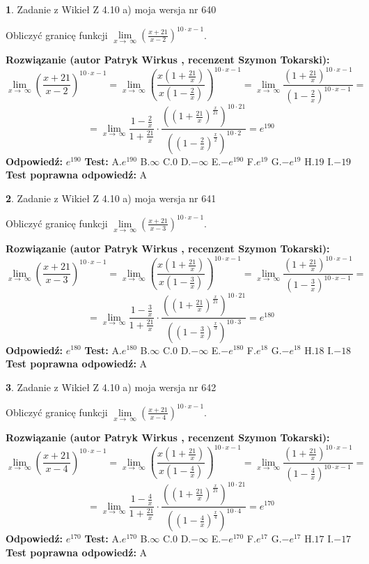 \documentclass[12pt, a4paper]{article}
\theoremstyle{definition} %
\newtheorem{zad}{}
\newcommand{\zadStart}[1]{\begin{zad}#1\newline}
\newcommand{\zadStop}{\end{zad}}
\newcommand{\rozwStart}[2]{\noindent \textbf{Rozwiązanie (autor #1 , recenzent #2): }\newline}
\newcommand{\rozwStop}{\newline}
\newcommand{\odpStart}{\noindent \textbf{Odpowiedź:}\newline}
\newcommand{\odpStop}{\newline}
\newcommand{\testStart}{\noindent \textbf{Test:}\newline}
\newcommand{\testStop}{\newline}
\newcommand{\kluczStart}{\noindent \textbf{Test poprawna odpowiedź:}\newline}
\newcommand{\kluczStop}{\newline}
\begin{document}
\zadStart{Zadanie z Wikieł Z 4.10 a) moja wersja nr 640}

Obliczyć granicę funkcji  $\lim\limits_{x\to\ \infty}(\frac{x+21}{x-2})^{10\cdot x-1}$.
\zadStop
\rozwStart{Patryk Wirkus}{Szymon Tokarski}
$$\lim\limits_{x\to\ \infty}(\frac{x+21}{x-2})^{10\cdot x-1} = \lim\limits_{x\to\ \infty}(\frac{x(1+\frac{21}{x})}{x(1-\frac{2}{x})})^{10\cdot x-1}=\lim\limits_{x\to\ \infty}\frac{(1+\frac{21}{x})^{10\cdot x-1}}{(1-\frac{2}{x})^{10\cdot x-1}}=$$
$$=\lim\limits_{x\to\ \infty}\frac{1-\frac{2}{x}}{1+\frac{21}{x}}\cdot\frac{((1+\frac{21}{x})^{\frac{x}{21}})^{10\cdot21}}{((1-\frac{2}{x})^{\frac{x}{2}})^{10\cdot2}}=e^{190}$$
\rozwStop
\odpStart
$e^{190}$
\odpStop
\testStart
A.$e^{190}$ B.$\infty$ C.$0$ D.$-\infty$ E.$-e^{190}$
F.$e^{19}$ G.$-e^{19}$
H.$19$
I.$-19$
\testStop
\kluczStart
A
\kluczStop



\zadStart{Zadanie z Wikieł Z 4.10 a) moja wersja nr 641}

Obliczyć granicę funkcji  $\lim\limits_{x\to\ \infty}(\frac{x+21}{x-3})^{10\cdot x-1}$.
\zadStop
\rozwStart{Patryk Wirkus}{Szymon Tokarski}
$$\lim\limits_{x\to\ \infty}(\frac{x+21}{x-3})^{10\cdot x-1} = \lim\limits_{x\to\ \infty}(\frac{x(1+\frac{21}{x})}{x(1-\frac{3}{x})})^{10\cdot x-1}=\lim\limits_{x\to\ \infty}\frac{(1+\frac{21}{x})^{10\cdot x-1}}{(1-\frac{3}{x})^{10\cdot x-1}}=$$
$$=\lim\limits_{x\to\ \infty}\frac{1-\frac{3}{x}}{1+\frac{21}{x}}\cdot\frac{((1+\frac{21}{x})^{\frac{x}{21}})^{10\cdot21}}{((1-\frac{3}{x})^{\frac{x}{3}})^{10\cdot3}}=e^{180}$$
\rozwStop
\odpStart
$e^{180}$
\odpStop
\testStart
A.$e^{180}$ B.$\infty$ C.$0$ D.$-\infty$ E.$-e^{180}$
F.$e^{18}$ G.$-e^{18}$
H.$18$
I.$-18$
\testStop
\kluczStart
A
\kluczStop



\zadStart{Zadanie z Wikieł Z 4.10 a) moja wersja nr 642}

Obliczyć granicę funkcji  $\lim\limits_{x\to\ \infty}(\frac{x+21}{x-4})^{10\cdot x-1}$.
\zadStop
\rozwStart{Patryk Wirkus}{Szymon Tokarski}
$$\lim\limits_{x\to\ \infty}(\frac{x+21}{x-4})^{10\cdot x-1} = \lim\limits_{x\to\ \infty}(\frac{x(1+\frac{21}{x})}{x(1-\frac{4}{x})})^{10\cdot x-1}=\lim\limits_{x\to\ \infty}\frac{(1+\frac{21}{x})^{10\cdot x-1}}{(1-\frac{4}{x})^{10\cdot x-1}}=$$
$$=\lim\limits_{x\to\ \infty}\frac{1-\frac{4}{x}}{1+\frac{21}{x}}\cdot\frac{((1+\frac{21}{x})^{\frac{x}{21}})^{10\cdot21}}{((1-\frac{4}{x})^{\frac{x}{4}})^{10\cdot4}}=e^{170}$$
\rozwStop
\odpStart
$e^{170}$
\odpStop
\testStart
A.$e^{170}$ B.$\infty$ C.$0$ D.$-\infty$ E.$-e^{170}$
F.$e^{17}$ G.$-e^{17}$
H.$17$
I.$-17$
\testStop
\kluczStart
A
\kluczStop
\end{document}
